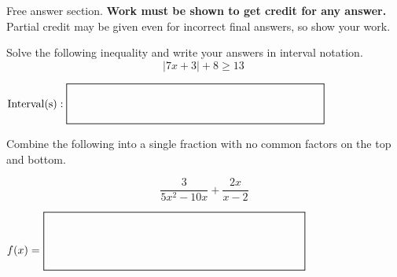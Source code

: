 \documentclass[addpoints,12pt]{exam}
\newcommand*{\Scale}[2][4]{\scalebox{#1}{\ensuremath{#2}}}%
\begin{document}
\begin{questions}
\newpage
\hspace{-.5in}Free answer section. \textbf{Work must be shown to get credit for any answer.} Partial credit may be given even for incorrect final answers, so show your work.

\question[7] Solve the following inequality and write your answers in interval notation. 
\begin{equation*}
|7x + 3| + 8 \geq 13\,
\end{equation*}

\vfill
\begin{center}
            $
               \mbox{Interval(s)}: \Scale[1.5]{\boxed{ \phantom{\dfrac{a}{b}} \hspace{5cm} }}
            $
            \end{center}
\question[7] Combine the following into a single fraction with no common factors on the top and bottom.

\[
\dfrac{3}{5x^2-10x}+\dfrac{2x}{x-2}
\]
\vfill
\begin{center}
            $
                \mbox{$f(x)=$ } \Scale[1.5]{\boxed{ \phantom{\dfrac{\dfrac{a}{b}}{b}} \hspace{5cm} }}
            $
            \end{center}
\newpage


\question
{}
\end{questions}
\end{document}
